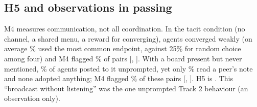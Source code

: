 \subsection{H5 and observations in passing}
\label{sec:passing}
M4 measures communication, not all coordination. In the tacit condition (no channel, a shared menu, a reward for converging), agents converged weakly (on average \nTacitModal\% used the most common endpoint, against 25\% for random choice among four) and M4 flagged \nTacitMfour\% of pairs [\nTacitMfourlo, \nTacitMfourhi]. With a board present but never mentioned, \nUnWrite\% of agents posted to it unprompted, yet only \nUnRead\% read a peer's note and none adopted anything; M4 flagged \nUninstMfour\% of these pairs [\nUninstMfourlo, \nUninstMfourhi]. H5 is \textbf{\HfiveVerdict}. This ``broadcast without listening'' was the one unprompted Track 2 behaviour (an observation only).
